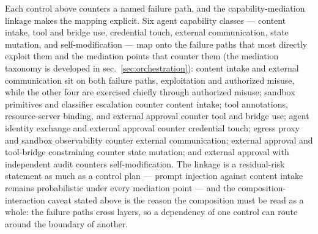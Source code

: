 \documentclass[
  english,
  9pt,
]{extarticle}
\begin{document}
Each control above counters a named failure path, and the
capability-mediation linkage makes the mapping explicit. Six agent
capability classes --- content intake, tool and bridge use, credential
touch, external communication, state mutation, and self-modification ---
map onto the failure paths that most directly exploit them and the
mediation points that counter them (the mediation taxonomy is developed
in sec.~\ref{sec:orchestration}): content intake and external
communication sit on both failure paths, exploitation and authorized
misuse, while the other four are exercised chiefly through authorized
misuse; sandbox primitives and classifier escalation counter content
intake; tool annotations, resource-server binding, and external approval
counter tool and bridge use; agent identity exchange and external
approval counter credential touch; egress proxy and sandbox
observability counter external communication; external approval and
tool-bridge constraining counter state mutation; and external approval
with independent audit counters self-modification. The linkage is a
residual-risk statement as much as a control plan --- prompt injection
against content intake remains probabilistic under every mediation point
--- and the composition-interaction caveat stated above is the reason
the composition must be read as a whole: the failure paths cross layers,
so a dependency of one control can route around the boundary of another.
\end{document}
